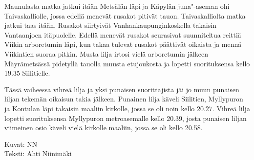 \begin{multicols}{2}
Maunulasta matka jatkui itään Metsälän läpi ja Käpylän juna"-aseman ohi 
Taivaskalliolle, jossa edellä menevät rusakot pitivät tauon. Taivaskalliolta 
matka jatkui taas itään. Rusakot siirtyivät Vanhankaupunginkoskella takaisin 
Vantaanjoen itäpuolelle. Edellä menevät rusakot seurasivat suunniteltua 
reittiä Viikin arboretumin läpi, kun takaa tulevat rusakot päättivät 
oikaista ja mennä Viikintien suoraa pitkin. Musta lilja irtosi vielä 
arboretumin jälkeen Mäyrämetsässä pidetyllä tauolla muusta etujoukosta ja 
lopetti suorituksensa kello 19.35 Siilitielle.

Tässä vaiheessa vihreä lilja ja yksi punaisen suorittajista jäi jo muun 
punaisen liljan tekemän oikaisun takia jälkeen. Punainen lilja käveli 
Siilitien, Myllypuron ja Kontulan läpi takaisin maaliin kirkolle, jossa se oli 
noin kello 20.27. Vihreä lilja lopetti suorituksensa Myllypuron metroasemalle 
kello 20.39, josta punaisen liljan viimeinen osio käveli vielä kirkolle 
maaliin, jossa se oli kello 20.58.
\end{multicols}

\vspace*{.50cm}
{\raggedleft Kuvat: NN\\Teksti: Ahti Niinimäki\par}
